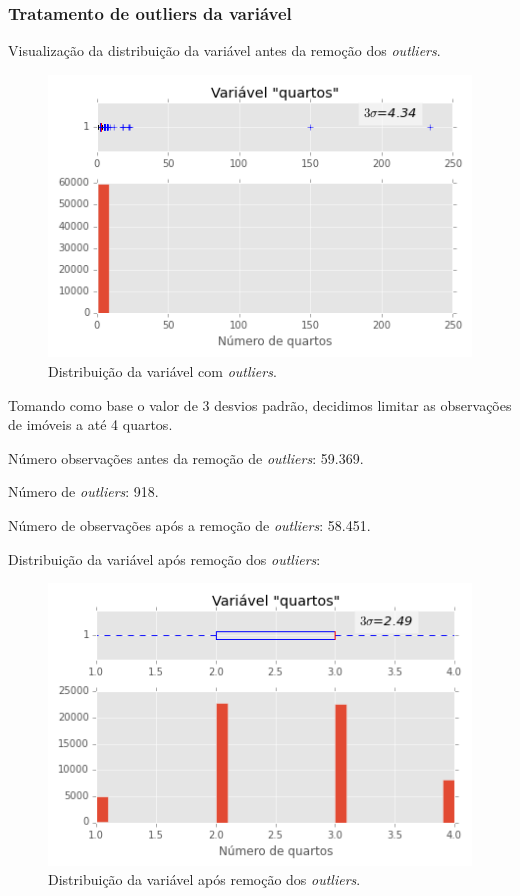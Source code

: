 \subsubsection{Tratamento de outliers da variável }

Visualização da distribuição da variável  antes da remoção dos \textit{outliers}. 


\begin{figure}[H]
\centering
		\includegraphics[width=0.8\linewidth]{img/var_quartos_boxhist_antes}
\caption{Distribuição da variável  com \textit{outliers}.}
\label{fig:var_quartos_boxhist_antes}
\end{figure}


Tomando como base o valor de 3 desvios padrão, decidimos limitar as observações de imóveis a até 4 quartos. 

Número observações antes da remoção de \textit{outliers}: 59.369. 

Número de \textit{outliers}: 918.

Número de observações após a remoção de \textit{outliers}: 58.451.

Distribuição da variável  após remoção dos \textit{outliers}:

	
\begin{figure}[H]
\centering
\includegraphics[width=0.8\linewidth]{img/var_quartos_boxhist_depois}
\caption{Distribuição da variável  após remoção dos \textit{outliers}.}
\label{fig:var_quartos_boxhist_depois}
\end{figure}




